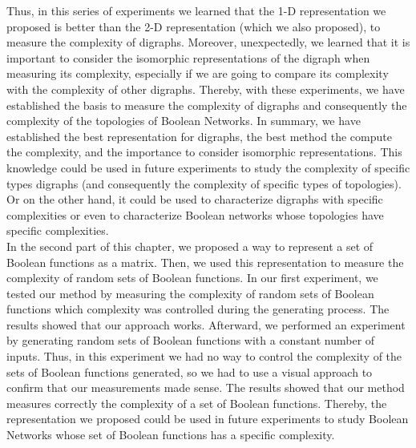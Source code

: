 Thus, in this series of experiments we learned that the 1-D representation we proposed is better than the 2-D representation (which we also proposed), to measure the complexity of digraphs. Moreover, unexpectedly, we learned that it is important to consider the isomorphic representations of the digraph when measuring its complexity, especially if we are going to compare its complexity with the complexity of other digraphs. Thereby, with these experiments, we have established the basis to measure the complexity of digraphs and consequently the complexity of the topologies of Boolean Networks. In summary, we have established the best representation for digraphs, the best method the compute the complexity, and the importance to consider isomorphic representations. This knowledge could be used in future experiments to study the complexity of specific types digraphs (and consequently the complexity of specific types of topologies). Or on the other hand, it could be used to characterize digraphs with specific complexities or even to characterize Boolean networks whose topologies have specific complexities.\\


In the second part of this chapter, we proposed a way to represent a set of Boolean functions as a matrix. Then, we used this representation to measure the complexity of random sets of Boolean functions. In our first experiment, we tested our method by measuring the complexity of random sets of Boolean functions which complexity was controlled during the generating process. The results showed that our approach works. Afterward, we performed an experiment by generating random sets of Boolean functions with a constant number of inputs. Thus, in this experiment we had no way to control the complexity of the sets of Boolean functions generated, so we had to use a visual approach to confirm that our measurements made sense. The results showed that our method measures correctly the complexity of a set of Boolean functions. Thereby, the representation we proposed could be used in future experiments to study Boolean Networks whose set of Boolean functions has a specific complexity.\\

